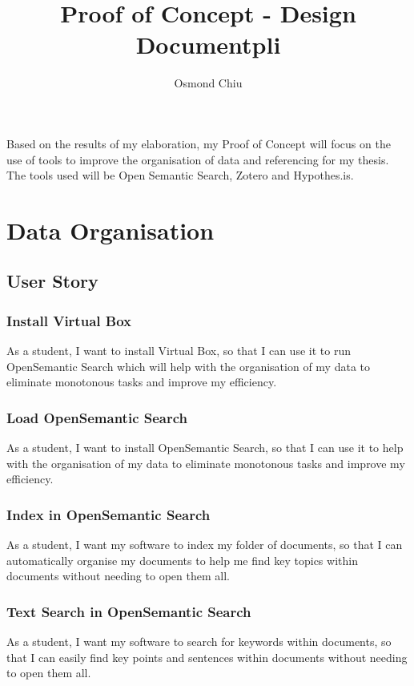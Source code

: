 \documentclass{article}
\title{Proof of Concept - Design Documentpli}
\author{Osmond Chiu}
\begin{document}
\maketitle

Based on the results of my elaboration, my Proof of Concept will focus on the use of tools to improve the organisation of data and referencing for my thesis. The tools used will be Open Semantic Search, Zotero and Hypothes.is.

\section*{Data Organisation}
\subsection*{User Story}

\subsubsection*{Install Virtual Box}

As a student, I want to install Virtual Box, so that I can use it to run OpenSemantic Search which will help with the organisation of my data to eliminate monotonous tasks and improve my efficiency.

\subsubsection*{Load OpenSemantic Search}

As a student, I want to install OpenSemantic Search, so that I can use it to help with the organisation of my data to eliminate monotonous tasks and improve my efficiency.

\subsubsection*{Index in OpenSemantic Search}

As a student, I want my software to index my folder of documents, so that I can automatically organise my documents to help me find key topics within documents without needing to open them all.

\subsubsection*{Text Search in OpenSemantic Search}

As a student, I want my software to search for keywords within documents, so that I can easily find key points and sentences within documents without needing to open them all.
\end{document}
